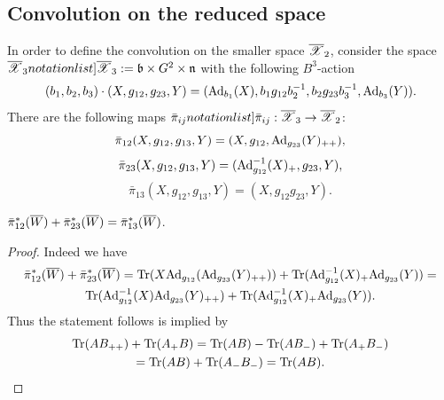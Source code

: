

\subsection{Convolution on the reduced space}
In order to define the convolution on the smaller space $\overline{\mathscr{X}}_2$, consider
the space $\SymbolPrint{\calXr_3}:=\frb\times G^2\times\frn$ with the following $B^3$-action
$$(b_1,b_2,b_3)\cdot (X,g_{12},g_{23},Y)=({\rm Ad}_{b_1}(X),b_1 g_{12} b_2^{-1}, b_2 g_{23} b_3^{-1}, {\rm Ad}_{b_3}(Y)).$$
 There are the following
maps $\SymbolPrint{\bar{\pi}_{ij}}:\calXr_3\to\calXr_2$:
\[ \bar{\pi}_{12}(X,g_{12},g_{13},Y)=(X,g_{12},{\rm Ad}_{g_{23}}(Y)_{++}),\] \[\bar{\pi}_{23}(X,g_{12},g_{13},Y)=({\rm Ad}_{g_{12}}^{-1}(X)_+,g_{23},Y),\]
\[\bar{\pi}_{13}(X,g_{12},g_{13},Y)=(X,g_{12}g_{23},Y).\]


\begin{proposition}
$\bar{\pi}_{12}^*(\overline{W})+\bar{\pi}_{23}^*(\overline{W})=\bar{\pi}_{13}^*(\overline{W})$.
\end{proposition}
\begin{proof}
Indeed we have
\begin{multline*}
\bar{\pi}_{12}^*(\overline{W})+\bar{\pi}_{23}^*(\overline{W})=\mathop{{\rm Tr}}\nolimits(X{\rm Ad}_{g_{12}}({\rm Ad}_{g_{23}}(Y)_{++}))+\mathop{{\rm Tr}}\nolimits({\rm Ad}_{g_{12}}^{-1}(X)_+{\rm Ad}_{g_{23}}(Y))=\\
\mathop{{\rm Tr}}\nolimits({\rm Ad}^{-1}_{g_{12}}(X){\rm Ad}_{g_{23}}(Y)_{++})+\mathop{{\rm Tr}}\nolimits({\rm Ad}^{-1}_{g_{12}}(X)_+{\rm Ad}_{g_{23}}(Y)).
\end{multline*}
Thus the statement follows is implied by
\begin{multline*} \mathop{{\rm Tr}}\nolimits(A B_{++})+\mathop{{\rm Tr}}\nolimits(A_+B)=\mathop{{\rm Tr}}\nolimits(AB)-\mathop{{\rm Tr}}\nolimits(AB_-)+\mathop{{\rm Tr}}\nolimits(A_+B_-)\\
  =\mathop{{\rm Tr}}\nolimits(AB)+\mathop{{\rm Tr}}\nolimits(A_-B_-)=\mathop{{\rm Tr}}\nolimits(AB).
\end{multline*}

\end{proof}

